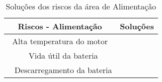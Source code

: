 \begin{table}[h]
\centering
\vspace{0.5cm}
\begin{tabular}{|c|c|}
\hline
Riscos - Alimentação & Soluções \\
\hline
Alta temperatura do motor     & \\ 
Vida útil da bateria          & \\ 
Descarregamento da bateria    & \\
\hline
\end{tabular}
\caption{Soluções dos riscos da área de Alimentação}
\label{tab:riscosubareaalim}
\end{table}
